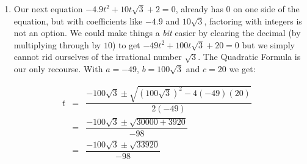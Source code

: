 \documentclass{ximera}
\begin{document}
\begin{example}
\begin{enumerate}
\[\begin{array}{rclr}
100x^2 - 420x + 441 & = & 0 & \text{Gather like terms} \\  

\end{array} \]

With highly composite numbers like $100$ and $441$, factoring seems inefficient at best,\footnote{This is actually the Perfect Square Trinomial $(10x - 21)^2$.} so we apply the Quadratic Formula with $a = 100$, $b = -420$ and $c = 441$:\[ \begin{array}{rclr}

x & = & \dfrac{-(-420) \pm \sqrt{(-420)^2 - 4(100)(441)}}{2(100)} & \\ [12pt]

 & = & \dfrac{420 \pm \sqrt{176000 - 176400}}{200} & \\ [12pt]

& = & \dfrac{420 \pm \sqrt{0}}{200} & \\ [12pt]

& = & \dfrac{420 \pm 0}{200} & \\ [12pt]
& = & \dfrac{420}{200} & \\ [12pt]

& = & \dfrac{21}{10} & \\

\end{array} \]

To our surprise and delight we obtain just one answer, $x = \frac{21}{10}$.

\item  Our next equation $-4.9t^2 + 10t\sqrt{3} + 2 = 0$, already has $0$ on one side of the equation, but with coefficients like $-4.9$ and $10\sqrt{3}$, factoring with integers is not an option.  We could make things a \textit{bit} easier by clearing the decimal (by multiplying through by $10$) to get  $-49t^2 + 100t\sqrt{3} + 20 = 0$ but we simply cannot rid ourselves of the irrational number $\sqrt{3}$.  The Quadratic Formula is our only recourse.  With $a = -49$, $b = 100\sqrt{3}$ and $c = 20$ we get: 

\[ \begin{array}{rclr}

t & = &  \dfrac{-100\sqrt{3} \pm \sqrt{(100\sqrt{3})^2 - 4(-49)(20)}}{2(-49)} & \\ [10pt]

& = &  \dfrac{-100\sqrt{3} \pm \sqrt{30000 +3920}}{-98}  & \\ [10pt]

& = &  \dfrac{-100\sqrt{3} \pm \sqrt{33920}}{-98}  & \\ [10pt]


\end{array}\]
\end{enumerate}
\end{example}
\end{document}
